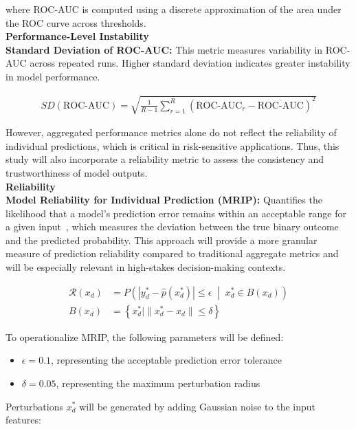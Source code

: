 \documentclass[12pt]{article}
\begin{document}
where ROC-AUC is computed using a discrete approximation of the area under the ROC curve across thresholds.\\

\textbf{Performance-Level Instability} \\
\tab \textbf{Standard Deviation of ROC-AUC:} This metric measures variability in ROC-AUC across repeated runs. Higher standard deviation indicates greater instability in model performance.

\begin{align}
SD(\text{ROC-AUC})=\sqrt{\frac{1}{R-1}\sum_{r=1}^{R}(\text{ROC-AUC}_r-\overline{\text{ROC-AUC}})^2}
\end{align}

However, aggregated performance metrics alone do not reflect the reliability of individual predictions, which is critical in risk-sensitive applications. Thus, this study will also incorporate a reliability metric to assess the consistency and trustworthiness of model outputs. \\

\textbf{Reliability} \\
\tab \textbf{Model Reliability for Individual Prediction (MRIP):} Quantifies the likelihood that a model's prediction error remains within an acceptable range for a given input~\cite{zhang2024reliability}, which measures the deviation between the true binary outcome and the predicted probability. This approach will provide a more granular measure of prediction reliability compared to traditional aggregate metrics and will be especially relevant in high-stakes decision-making contexts.

\begin{align}
\mathcal{R}(x_d) &=
  P\left(
    \left| y_d^* - \hat{p}(x_d^*) \right| \le \epsilon
    \;\middle|\;
    x_d^* \in B(x_d)
  \right) \\
B(x_d) &= \left\{ x_d^* \mid \| x_d^* - x_d \| \le \delta \right\}
\end{align}

To operationalize MRIP, the following parameters will be defined:

\begin{itemize}
    \item $\epsilon = 0.1$, representing the acceptable prediction error tolerance
    \item $\delta = 0.05$, representing the maximum perturbation radius
\end{itemize}

Perturbations $x_d^*$ will be generated by adding Gaussian noise to the input features:
\end{document}
